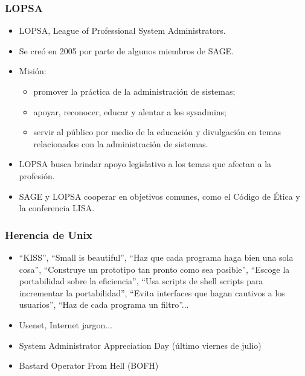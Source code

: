 \documentclass{beamer}
\begin{document}


\begin{frame}
\frametitle{LOPSA}

\begin{itemize}
\item LOPSA, League of Professional System Administrators.
\item Se creó en 2005 por parte de algunos miembros de SAGE. 
\item Misión: 
	\begin{itemize}
	\item promover la práctica de la administración de sistemas; 
	\item apoyar, reconocer, educar y alentar a los sysadmins; 	
 	\item servir al público por medio de la educación y divulgación en temas relacionados con la administración de sistemas.
	\end{itemize}
\item LOPSA busca brindar apoyo legislativo a los temas que afectan a la profesión.
\item SAGE y LOPSA cooperar en objetivos comunes, como el Código de Ética y la conferencia LISA.

\end{itemize}
\end{frame}


\begin{frame}
\frametitle{Herencia de Unix}

\begin{itemize}
\item ``KISS'', ``Small is beautiful'', ``Haz que cada programa haga bien una sola cosa'', ``Construye un prototipo tan pronto como sea posible'', ``Escoge la portabilidad sobre la eficiencia'', ``Usa scripts de shell scripts para incrementar la portabilidad'', ``Evita interfaces que hagan cautivos a los usuarios'', ``Haz de cada programa un filtro''...
\item Usenet, Internet jargon... 
\item System Administrator Appreciation Day (último viernes de julio)
\item Bastard Operator From Hell (BOFH)
\end{itemize}
\end{frame}


\end{document}
